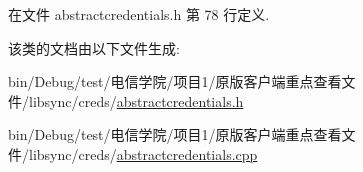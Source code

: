 在文件 abstractcredentials.\+h 第 78 行定义.



该类的文档由以下文件生成\+:\begin{DoxyCompactItemize}
\item 
bin/\+Debug/test/电信学院/项目1/原版客户端重点查看文件/libsync/creds/\hyperlink{abstractcredentials_8h}{abstractcredentials.\+h}\item 
bin/\+Debug/test/电信学院/项目1/原版客户端重点查看文件/libsync/creds/\hyperlink{abstractcredentials_8cpp}{abstractcredentials.\+cpp}\end{DoxyCompactItemize}
